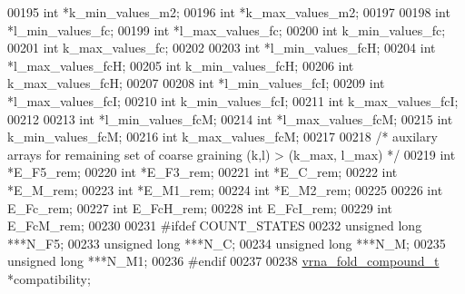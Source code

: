 \begin{DoxyCode}
00195   \textcolor{keywordtype}{int}             *k\_min\_values\_m2;
00196   \textcolor{keywordtype}{int}             *k\_max\_values\_m2;
00197 
00198   \textcolor{keywordtype}{int}             *l\_min\_values\_fc;
00199   \textcolor{keywordtype}{int}             *l\_max\_values\_fc;
00200   \textcolor{keywordtype}{int}             k\_min\_values\_fc;
00201   \textcolor{keywordtype}{int}             k\_max\_values\_fc;
00202 
00203   \textcolor{keywordtype}{int}             *l\_min\_values\_fcH;
00204   \textcolor{keywordtype}{int}             *l\_max\_values\_fcH;
00205   \textcolor{keywordtype}{int}             k\_min\_values\_fcH;
00206   \textcolor{keywordtype}{int}             k\_max\_values\_fcH;
00207 
00208   \textcolor{keywordtype}{int}             *l\_min\_values\_fcI;
00209   \textcolor{keywordtype}{int}             *l\_max\_values\_fcI;
00210   \textcolor{keywordtype}{int}             k\_min\_values\_fcI;
00211   \textcolor{keywordtype}{int}             k\_max\_values\_fcI;
00212 
00213   \textcolor{keywordtype}{int}             *l\_min\_values\_fcM;
00214   \textcolor{keywordtype}{int}             *l\_max\_values\_fcM;
00215   \textcolor{keywordtype}{int}             k\_min\_values\_fcM;
00216   \textcolor{keywordtype}{int}             k\_max\_values\_fcM;
00217 
00218   \textcolor{comment}{/* auxilary arrays for remaining set of coarse graining (k,l) > (k\_max, l\_max) */}
00219   \textcolor{keywordtype}{int}             *E\_F5\_rem;
00220   \textcolor{keywordtype}{int}             *E\_F3\_rem;
00221   \textcolor{keywordtype}{int}             *E\_C\_rem;
00222   \textcolor{keywordtype}{int}             *E\_M\_rem;
00223   \textcolor{keywordtype}{int}             *E\_M1\_rem;
00224   \textcolor{keywordtype}{int}             *E\_M2\_rem;
00225 
00226   \textcolor{keywordtype}{int}             E\_Fc\_rem;
00227   \textcolor{keywordtype}{int}             E\_FcH\_rem;
00228   \textcolor{keywordtype}{int}             E\_FcI\_rem;
00229   \textcolor{keywordtype}{int}             E\_FcM\_rem;
00230 
00231 \textcolor{preprocessor}{#ifdef COUNT\_STATES}
00232   \textcolor{keywordtype}{unsigned} \textcolor{keywordtype}{long}             ***N\_F5;
00233   \textcolor{keywordtype}{unsigned} \textcolor{keywordtype}{long}             ***N\_C;
00234   \textcolor{keywordtype}{unsigned} \textcolor{keywordtype}{long}             ***N\_M;
00235   \textcolor{keywordtype}{unsigned} \textcolor{keywordtype}{long}             ***N\_M1;
00236 \textcolor{preprocessor}{#endif}
00237 
00238   \hyperlink{group__fold__compound_structvrna__fc__s}{vrna\_fold\_compound\_t} *compatibility;

\end{DoxyCode}
